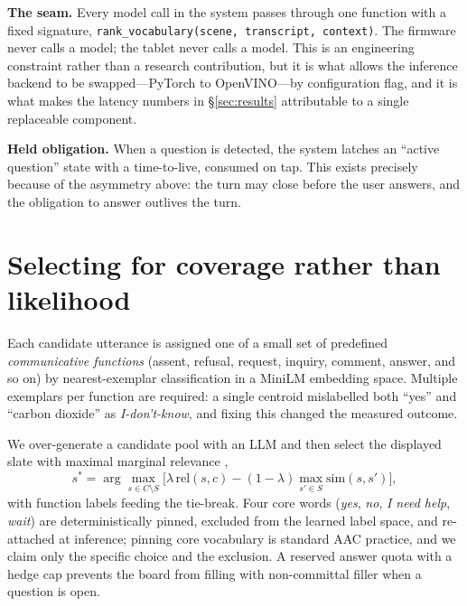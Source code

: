 \documentclass{article}
\begin{document}
\textbf{The seam.} Every model call in the system passes through one function
with a fixed signature,
\texttt{rank\_vocabulary(scene, transcript, context)}. The firmware never calls
a model; the tablet never calls a model. This is an engineering constraint
rather than a research contribution, but it is what allows the inference backend
to be swapped---PyTorch to OpenVINO---by configuration flag, and it is what
makes the latency numbers in \S\ref{sec:results} attributable to a single
replaceable component.

\textbf{Held obligation.} When a question is detected, the system latches an
``active question'' state with a time-to-live, consumed on tap. This exists
precisely because of the asymmetry above: the turn may close before the user
answers, and the obligation to answer outlives the turn.

\section{Selecting for coverage rather than likelihood}

Each candidate utterance is assigned one of a small set of predefined
\emph{communicative functions} (assent, refusal, request, inquiry, comment,
answer, and so on) by nearest-exemplar classification in a MiniLM
\citep{minilm} embedding space. Multiple exemplars per function are required:
a single centroid mislabelled both ``yes'' and ``carbon dioxide'' as
\emph{I-don't-know}, and fixing this changed the measured outcome.

We over-generate a candidate pool with an LLM and then select the displayed
slate with maximal marginal relevance \citep{mmr1998},
\begin{equation}
s^{*} = \arg\max_{s \in C \setminus S}
\Big[\lambda\,\mathrm{rel}(s, c) - (1-\lambda)\max_{s' \in S}\mathrm{sim}(s, s')\Big],
\end{equation}
with function labels feeding the tie-break. Four core words
(\emph{yes}, \emph{no}, \emph{I need help}, \emph{wait}) are deterministically
pinned, excluded from the learned label space, and re-attached at inference;
pinning core vocabulary is standard AAC practice, and we claim only the specific
choice and the exclusion. A reserved answer quota with a hedge cap prevents the
board from filling with non-committal filler when a question is open.
\end{document}

